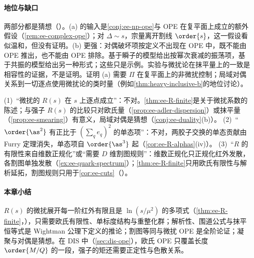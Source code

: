 \paragraph{地位与缺口}两部分都是猜想（\tagC）。(a) 的输入是\cref{conj:ee-np-ope}与 OPE 在复平面上成立的额外假设（\cref{rem:ee-complex-ope}）；对 $\Delta\sim s$，宗量离开割线 $\order{s}$，这一假设看似温和，但没有证明。(b) 更强：对偶破坏项按定义不出现在 OPE 中，既不能由 OPE 推出，也不能由 OPE 排除。基于瞬子的模型给出按幂次衰减的振荡项，基于共振的模型给出另一种形式；这些只是示例\cite{Shifman2000}。实验与微扰论在抹平量上的一致是相容性的证据，不是证明。证明 (a) 需要 $\Pi$ 在复平面上的非微扰控制；局域对偶关系到一切逐点使用微扰论的类时量（例如\cref{thm:heavy-inclusive-b}的地位讨论）。

\begin{remark}[常见误解]\label{rem:ee-misconceptions}
(1)~“微扰的 $R(s)$ 在 $s$ 上逐点成立”：不对。\cref{thm:ee-R-finite}是关于微扰系数的陈述；与强子 $R(s)$ 的比较只对欧氏量（\cref{prop:ee-adler-dispersion}）或抹平量（\cref{prop:ee-smearing}）有意义，局域对偶是猜想（\cref{conj:ee-duality}(b)）。
(2)~“$\order{\as^2}$ 有正比于 $(\sum_qe_q)^2$ 的单态项”：不对，两胶子交换的单态贡献由 Furry 定理消失，单态项自 $\order{\as^3}$ 起（\cref{cor:ee-R-alphas}(iv)）。
(3)~“$R$ 的有限性来自维数正规化”或“需要 $D$ 维割图规则”：维数正规化只正规化红外发散，各割图单独发散（\cref{ex:ee-quark-spectrum}）；\cref{thm:ee-R-finite}只用欧氏有限性与解析延拓，割图规则只用于\cref{cor:ee-cuts}（\tagA）。
\end{remark}

\paragraph{本章小结}$R(s)$ 的微扰展开每一阶红外有限且是 $\ln(s/\mu^2)$ 的多项式（\cref{thm:ee-R-finite}，\tagR），只需要欧氏有限性、单标度结构与重整化群；解析性、围道公式与抹平恒等式是 Wightman 公理下定义的推论；割图等同与微扰 OPE 是全阶论证；凝聚与对偶是猜想。在 DIS 中（\cref{sec:dis-ope}），欧氏 OPE 只覆盖长度 $\order{M/Q}$ 的一段，强子的矩还需要正定性与色散关系。
